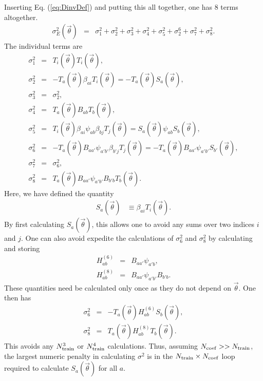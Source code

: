 \documentclass[UserManual.tex]{subfiles}
\begin{document}
Inserting Eq. (\ref{eq:DinvDef}) and putting this all together, one has 8 terms altogether.
\begin{eqnarray}
\sigma_E^2(\vec{\theta})&=&
\sigma^2_1+\sigma_2^2+\sigma^2_3+\sigma^2_4+\sigma^2_5+\sigma_2^6+\sigma^2_7+\sigma^2_8.
\end{eqnarray}
The individual terms are
\begin{eqnarray}
\sigma_1^2&=&T_i(\vec{\theta})T_i(\vec{\theta}),\\
\nonumber
\sigma_2^2&=&-T_a(\vec{\theta})\beta_{ai}T_i(\vec{\theta})=-T_a(\vec{\theta})S_a(\vec{\theta}),\\
\nonumber
\sigma_3^2&=&\sigma_2^2,\\
\nonumber
\sigma_4^2&=&T_a(\vec{\theta})B_{ab}T_b(\vec{\theta}),\\
\nonumber
\sigma_5^2&=&T_i(\vec{\theta})\beta_{ai}\psi_{ab}\beta_{bj}T_j(\vec{\theta})=S_a(\vec{\theta})\psi_{ab}S_b(\vec{\theta}),\\
\nonumber
\sigma_6^2&=&-T_a(\vec{\theta})B_{aa'}\psi_{a'b'}\beta_{b'j}T_j(\vec{\theta})=-T_a(\vec{\theta})B_{aa'}\psi_{a'b'}S_{b'}(\vec{\theta}),\\
\nonumber
\sigma_7^2&=&\sigma_6^2,\\
\nonumber
\sigma_8^2&=&T_a(\vec{\theta})B_{aa'}\psi_{a'b'}B_{b'b}T_b(\vec{\theta}).
\end{eqnarray}
Here, we have defined the quantity 
\begin{eqnarray}
S_a(\vec{\theta})&\equiv \beta_{ai}T_i(\vec{\theta}).
\end{eqnarray}
By first calculating $S_a(\vec{\theta})$, this allows one to avoid any sums over two indices $i$ and $j$. One can also avoid expedite the calculations of $\sigma_6^2$ and $\sigma_8^2$ by calculating and storing
\begin{eqnarray}
H^{(6)}_{ab}&=&B_{aa'}\psi_{a'b},\\
H^{(8)}_{ab}&=&B_{aa'}\psi_{a'b'}B_{b'b}.
\end{eqnarray}
These quantities need be calculated only once as they do not depend on $\vec{\theta}$. One then has
\begin{eqnarray}
\sigma_6^2&=&-T_{a}(\vec{\theta})H^{(6)}_{ab}S_b(\vec{\theta}),\\
\sigma_8^2&=&T_a(\vec{\theta})H^{(8)}_{ab}T_b(\vec{\theta}).
\end{eqnarray}
This avoids any $N_{\rm train}^3$ or $N_{\rm train}^4$ calculations. Thus, assuming $N_{\rm coef}>>N_{\rm train}$, the largest numeric penalty in calculating $\sigma^2$ is in the $N_{\rm train}\times N_{\rm coef}$ loop required to calculate $S_a(\vec{\theta})$ for all $a$. 
\end{document}
